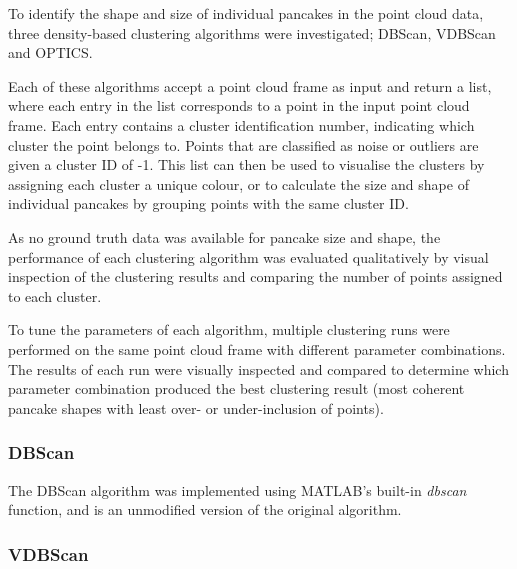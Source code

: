 To identify the shape and size of individual pancakes in the point cloud data, three density-based clustering algorithms were investigated; \ac{DBScan}, \ac{VDBScan} and \ac{OPTICS}. 

Each of these algorithms accept a point cloud frame as input and return a list, where each entry in the list corresponds to a point in the input point cloud frame. Each entry contains a cluster identification number, indicating which cluster the point belongs to. Points that are classified as noise or outliers are given a cluster ID of -1. This list can then be used to visualise the clusters by assigning each cluster a unique colour, or to calculate the size and shape of individual pancakes by grouping points with the same cluster ID. 

As no ground truth data was available for pancake size and shape, the performance of each clustering algorithm was evaluated qualitatively by visual inspection of the clustering results and comparing the number of points assigned to each cluster.

To tune the parameters of each algorithm, multiple clustering runs were performed on the same point cloud frame with different parameter combinations. The results of each run were visually inspected and compared to determine which parameter combination produced the best clustering result (most coherent pancake shapes with least over- or under-inclusion of points).

\subsubsection{DBScan}
\label{subsec:ch6.section3.subsec4.subsubsec1}

The \ac{DBScan} algorithm was implemented using MATLAB's built-in \emph{dbscan} function, and is an unmodified version of the original algorithm.

\subsubsection{VDBScan}
\label{subsec:ch6.section3.subsec4.subsubsec2}

